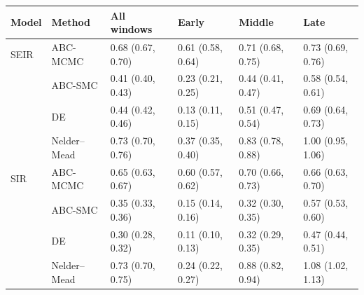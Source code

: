 \begin{tabular}{llllll}
\toprule
Model & Method & All windows & Early & Middle & Late \\
\midrule
SEIR & ABC-MCMC & 0.68 (0.67, 0.70) & 0.61 (0.58, 0.64) & 0.71 (0.68, 0.75) & 0.73 (0.69, 0.76) \\
 & ABC-SMC & 0.41 (0.40, 0.43) & 0.23 (0.21, 0.25) & 0.44 (0.41, 0.47) & 0.58 (0.54, 0.61) \\
 & DE & 0.44 (0.42, 0.46) & 0.13 (0.11, 0.15) & 0.51 (0.47, 0.54) & 0.69 (0.64, 0.73) \\
 & Nelder--Mead & 0.73 (0.70, 0.76) & 0.37 (0.35, 0.40) & 0.83 (0.78, 0.88) & 1.00 (0.95, 1.06) \\
\midrule
SIR & ABC-MCMC & 0.65 (0.63, 0.67) & 0.60 (0.57, 0.62) & 0.70 (0.66, 0.73) & 0.66 (0.63, 0.70) \\
 & ABC-SMC & 0.35 (0.33, 0.36) & 0.15 (0.14, 0.16) & 0.32 (0.30, 0.35) & 0.57 (0.53, 0.60) \\
 & DE & 0.30 (0.28, 0.32) & 0.11 (0.10, 0.13) & 0.32 (0.29, 0.35) & 0.47 (0.44, 0.51) \\
 & Nelder--Mead & 0.73 (0.70, 0.75) & 0.24 (0.22, 0.27) & 0.88 (0.82, 0.94) & 1.08 (1.02, 1.13) \\
\bottomrule
\end{tabular}

